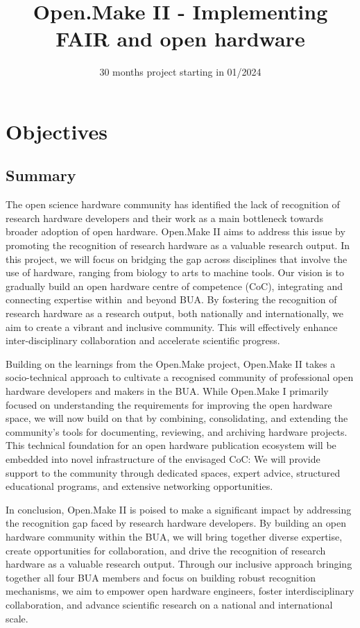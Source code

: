 \documentclass[
  12pt,
  a4paper,
]{article}
\title{Open.Make II - Implementing FAIR and open hardware}
\subtitle{30 months project starting in 01/2024}
\author{
Prof.~Dr.-Ing. Roland Jochem \\
Chair of Quality Science, Institute for Machine Tools \\
and Factory Management, Technische Universität Berlin (TUB) \\
\href{mailto:roland.jochem@tu-berlin.de}{\nolinkurl{roland.jochem@tu-berlin.de}}\\
+49 30 314 22005. \\
\and 
Prof.~Matthew Larkum, PhD \\
 \\
Institute of Biology, Humboldt-Universität zu Berlin (HUB). \\
\href{mailto:matthew.larkum@hu-berlin.de}{\nolinkurl{matthew.larkum@hu-berlin.de}}\\
+49 30 450 539 152. \\
\and 
Prof.~Dr.~Tim Landgraf \\
Dahlem Center for Machine Learning and Robotics, \\
Institute of Computer Science, Freie Universität Berlin (FUB) \\
\href{mailto:tim.landgraf@fu-berlin.de}{\nolinkurl{tim.landgraf@fu-berlin.de}}\\
+49 30 838 75114. \\
\and 
Prof.~Dr.~med. Petra Ritter \\
Berlin Institute of Health \& Dept. of Neurology \\
Charité - Universitätsmedizin Berlin (CUB) \\
\href{mailto:petra.ritter@bih-charite.de}{\nolinkurl{petra.ritter@bih-charite.de}}\\
+49 30 450 560 005 \\
\and }
\date{}
\begin{document}
\maketitle

\newpage

\hypertarget{objectives}{%
\section{Objectives}\label{objectives}}

\hypertarget{summary}{%
\subsection{Summary}\label{summary}}

The open science hardware community has identified the lack of
recognition of research hardware developers and their work as a main
bottleneck towards broader adoption of open hardware. Open.Make II aims
to address this issue by promoting the recognition of research hardware
as a valuable research output. In this project, we will focus on
bridging the gap across disciplines that involve the use of hardware,
ranging from biology to arts to machine tools. Our vision is to
gradually build an open hardware centre of competence (CoC), integrating
and connecting expertise within~and beyond BUA. By fostering the
recognition of research hardware as a research output, both nationally
and internationally, we aim to create a vibrant and inclusive community.
This will effectively enhance inter-disciplinary collaboration and
accelerate scientific progress.

Building on the learnings from the Open.Make project, Open.Make II takes
a socio-technical approach to cultivate a recognised community of
professional open hardware developers and makers in the BUA. While
Open.Make I primarily focused on understanding the requirements for
improving the open hardware space, we will now build on that by
combining, consolidating, and extending the community's tools for
documenting, reviewing, and archiving hardware projects. This technical
foundation for an open hardware publication ecosystem will be embedded
into novel infrastructure of the envisaged CoC: We will provide support
to the community through dedicated spaces, expert advice, structured
educational programs, and extensive networking opportunities.

In conclusion, Open.Make II is poised to make a significant impact by
addressing the recognition gap faced by research hardware developers. By
building an open hardware community within the BUA, we will bring
together diverse expertise, create opportunities for collaboration, and
drive the recognition of research hardware as a valuable research
output. Through our inclusive approach bringing together all four BUA
members and focus on building robust recognition mechanisms, we aim to
empower open hardware engineers, foster interdisciplinary collaboration,
and advance scientific research on a national and international scale.
\end{document}
